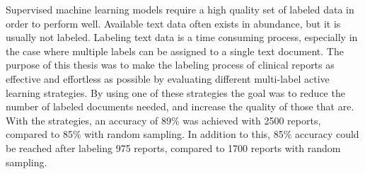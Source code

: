 Supervised machine learning models require a high quality set of labeled data in order to perform well.
Available text data often exists in abundance, but it is usually not labeled.
Labeling text data is a time consuming process, especially in the case where multiple labels can be assigned to a single text document.
The purpose of this thesis was to make the labeling process of clinical reports as effective and effortless as possible by evaluating different multi-label active learning strategies.
By using one of these strategies the goal was to reduce the number of labeled documents needed, and increase the quality of those that are.
With the strategies, an accuracy of 89\% was achieved with 2500 reports, compared to 85\% with random sampling.
In addition to this, 85\% accuracy could be reached after labeling 975 reports, compared to 1700 reports with random sampling.